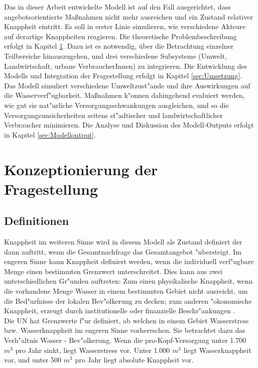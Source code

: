 \documentclass[11pt,a4paper]{article}
\begin{document}
Das in dieser Arbeit entwickelte Modell ist auf den Fall ausgerichtet, dass angebotsorientierte Maßnahmen nicht mehr ausreichen und ein Zustand relativer Knappheit eintritt. Es soll in erster Linie simulieren, wie verschiedene Akteure auf derartige Knappheiten reagieren. Die theoretische Problembeschreibung erfolgt in Kapitel \ref{sec:Konzeptionierung}. Dazu ist es notwendig, über die Betrachtung einzelner Teilbereiche hinauszugehen, und drei verschiedene Subsysteme (Umwelt, Landwirtschaft, urbane VerbraucherInnen) zu integrieren. Die Entwicklung des Modells und Integration der Fragestellung erfolgt in Kapitel \ref{sec:Umsetzung}.\\
Das Modell simuliert verschiedene Umweltzust"ande und ihre Auswirkungen auf die Wasserverf"ugbarkeit. Maßnahmen k"onnen dahingehend evaluiert werden, wie gut sie nat"urliche Versorgungsschwankungen ausgleichen, und so die Versorgungsunsicherheiten seitens st"adtischer und landwirtschaftlicher Verbraucher minimieren. Die Analyse und Diskussion des Modell-Outputs erfolgt in Kapitel \ref{sec:Modelloutput}.


\section{Konzeptionierung der Fragestellung}
\label{sec:Konzeptionierung}

\subsection{Definitionen}

Knappheit im weiteren Sinne wird in diesem Modell als Zustand definiert der dann auftritt, wenn die Gesamtnachfrage das Gesamtangebot "ubersteigt. Im engeren Sinne kann Knappheit definiert werden, wenn die individuell verf"ugbare Menge einen bestimmten Grenzwert unterschreitet. Dies kann aus zwei unterschiedlichen Gr"unden auftreten: Zum einen physikalische Knappheit, wenn die vorhandene Menge Wasser in einem bestimmten Gebiet nicht ausreicht, um die Bed"urfnisse der lokalen Bev"olkerung zu decken; zum anderen "okonomische Knappheit, erzeugt durch institutionelle oder finanzielle Beschr"ankungen \citep{UN2012}.\\
Die UN hat Grenzwerte f"ur definiert, ab welchen in einem Gebiet Wasserstress bzw. Wasserknappheit im engeren Sinne vorherrschen. Sie betrachtet dazu das Verh"altnis Wasser - Bev"olkerung. Wenn die pro-Kopf-Versorgung unter 1.700 $m^3$ pro Jahr sinkt, liegt Wasserstress vor. Unter 1.000 $m^3$  liegt Wasser\-knappheit vor, und unter 500 $m^3$ pro Jahr liegt absolute Knappheit vor.\\
\end{document}
